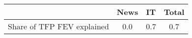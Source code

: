 \begin{small}
	\begin{tabular}{lccc}
	\hline
		& News & IT & Total \\
		\hline
		Share of TFP FEV explained & 0.0 & 0.7 & 0.7 \\
		\hline
	\end{tabular}
\end{small}
